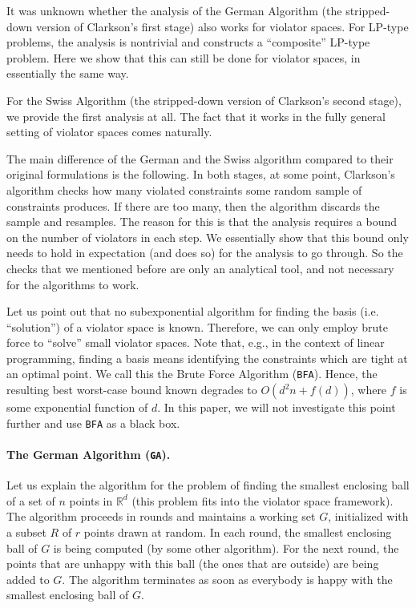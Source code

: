 \documentclass[12pt]{article}
\theoremstyle{remark}
\def\stageI{\texttt{GA}}
\def\stageIII{\texttt{BFA}}
\begin{document}
It was unknown whether the analysis of the German Algorithm (the
stripped-down version of Clarkson's first stage) also works for
violator spaces. For LP-type problems, the analysis is nontrivial and
constructs a ``composite'' LP-type problem. Here we show that this can
still be done for violator spaces, in essentially the same way.

For the Swiss Algorithm (the stripped-down version of Clarkson's
second stage), we provide the first analysis at all. The fact that it
works in the fully general setting of violator spaces comes naturally.

The main difference of the German and the Swiss algorithm compared
to their original formulations is the following. In both stages, at some point,
Clarkson's algorithm checks how many violated constraints some random
sample of constraints produces.
If there are too many, then the algorithm discards the sample and resamples.
The reason for this is that the analysis requires a bound on the number of
violators in each step. We essentially show that this bound only needs to hold
in expectation (and does so) for the analysis to go through.
So the  checks that we mentioned before are only an analytical tool, and not necessary for
the algorithms to work.

Let us point out that no subexponential
algorithm for finding the basis (i.e. ``solution'') of a violator space is known. Therefore,
we can only employ brute force to ``solve'' small violator spaces. Note that,
e.g., in the context of linear programming, finding a basis means identifying the
constraints which are tight at an optimal point. We
call this the Brute Force Algorithm (\stageIII). Hence, the resulting best
worst-case bound known degrades to $O(d^2n + f(d))$, where $f$ is
some exponential function of $d$. In this paper, we will not investigate
this point further and use \stageIII{ }as a black box.

\paragraph{The German Algorithm (\stageI).}
Let us explain the algorithm for the problem of finding the smallest
enclosing ball of a set of $n$ points in $\mathbb{R}^d$ (this problem fits
into the violator space framework). The algorithm proceeds in rounds
and maintains a working set $G$, initialized with a subset $R$ of $r$
points drawn at random. In each round, the smallest enclosing ball of
$G$ is being computed (by some other algorithm). For the next round,
the points that are unhappy with this ball (the ones that are outside)
are being added to $G$. The algorithm terminates as soon as everybody
is happy with the smallest enclosing ball of $G$.
\end{document}
